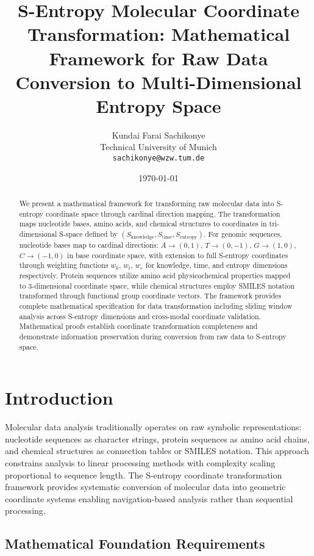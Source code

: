 \documentclass[12pt,a4paper]{article}
\title{S-Entropy Molecular Coordinate Transformation: Mathematical Framework for Raw Data Conversion to Multi-Dimensional Entropy Space}
\author{
Kundai Farai Sachikonye\\
Technical University of Munich\\
\texttt{sachikonye@wzw.tum.de}
}
\date{\today}
\begin{document}
\maketitle

\begin{abstract}
We present a mathematical framework for transforming raw molecular data into S-entropy coordinate space through cardinal direction mapping. The transformation maps nucleotide bases, amino acids, and chemical structures to coordinates in tri-dimensional S-space defined by $(S_{\text{knowledge}}, S_{\text{time}}, S_{\text{entropy}})$. For genomic sequences, nucleotide bases map to cardinal directions: $A \rightarrow (0,1)$, $T \rightarrow (0,-1)$, $G \rightarrow (1,0)$, $C \rightarrow (-1,0)$ in base coordinate space, with extension to full S-entropy coordinates through weighting functions $w_k$, $w_t$, $w_e$ for knowledge, time, and entropy dimensions respectively. Protein sequences utilize amino acid physicochemical properties mapped to 3-dimensional coordinate space, while chemical structures employ SMILES notation transformed through functional group coordinate vectors. The framework provides complete mathematical specification for data transformation including sliding window analysis across S-entropy dimensions and cross-modal coordinate validation. Mathematical proofs establish coordinate transformation completeness and demonstrate information preservation during conversion from raw data to S-entropy space.
\end{abstract}

\section{Introduction}

Molecular data analysis traditionally operates on raw symbolic representations: nucleotide sequences as character strings, protein sequences as amino acid chains, and chemical structures as connection tables or SMILES notation. This approach constrains analysis to linear processing methods with complexity scaling proportional to sequence length. The S-entropy coordinate transformation framework provides systematic conversion of molecular data into geometric coordinate systems enabling navigation-based analysis rather than sequential processing.

\subsection{Mathematical Foundation Requirements}
\end{document}
